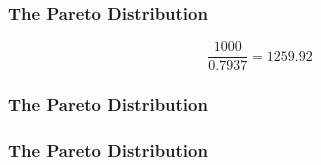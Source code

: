 \documentclass{beamer}
\begin{document}
\begin{frame}
	\frametitle{The Pareto Distribution}
	\LARGE
	\vspace{-3.2cm}
\[\frac{1000}{0.7937} = 1259.92\]
\end{frame}
\begin{frame}
	\frametitle{The Pareto Distribution}
	\LARGE
	
\end{frame}
\begin{frame}
	\frametitle{The Pareto Distribution}
	\LARGE
	
\end{frame}
\end{document}
